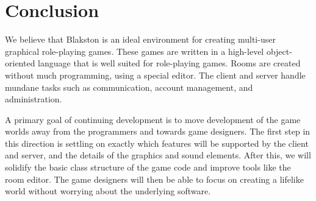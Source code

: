\documentclass[12pt]{article}
\begin{document}
\section{Conclusion}

We believe that Blakston is an ideal environment for creating
multi-user graphical role-playing games.  These games are written in a
high-level object-oriented language that is well suited for
role-playing games.  Rooms are created without much programming, using
a special editor.  The client and server handle mundane tasks such as
communication, account management, and administration.

A primary goal of continuing development is to move development of the
game worlds away from the programmers and towards game designers.  The
first step in this direction is settling on exactly which features
will be supported by the client and server, and the details of the
graphics and sound elements.  After this, we will solidify the basic
class structure of the game code and improve tools like the room
editor.  The game designers will then be able to focus on creating a
lifelike world without worrying about the underlying software.
\end{document}
